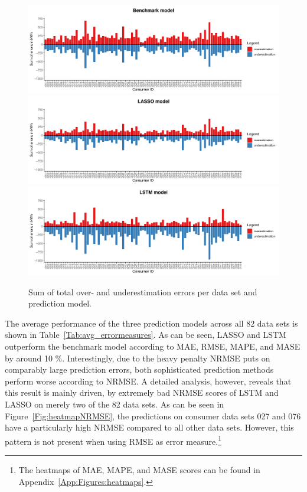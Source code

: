 \begin{figure}
    \centering
    \includegraphics[width=\textwidth]{thesis/graphs/evaluation/c_barplot_naive_overunderestimation.pdf}\\\vspace{.6cm}
    \includegraphics[width=\textwidth]{thesis/graphs/evaluation/c_barplot_LASSO_overunderestimation.pdf}\\\vspace{.6cm}
    \includegraphics[width=\textwidth]{thesis/graphs/evaluation/c_barplot_LSTM_overunderestimation.pdf}
    \caption[Sum of total over- and underestimation errors per data set]{Sum of total over- and underestimation errors per data set and prediction model. \quantnet\href{}{}}
    \label{Fig:overunderestimation}
\end{figure}
%
The average performance of the three prediction models across all 82 data sets is shown in Table~\ref{Tab:avg_errormeasures}. As can be seen, LASSO and LSTM outperform the benchmark model according to MAE, RMSE, MAPE, and MASE by around 10 \%. Interestingly, due to the heavy penalty NRMSE puts on comparably large prediction errors, both sophisticated prediction methods perform worse according to NRMSE. A detailed analysis, however, reveals that this result is mainly driven, by extremely bad NRMSE scores of LSTM and LASSO on merely two of the 82 data sets. As can be seen in Figure~\ref{Fig:heatmapNRMSE}, the predictions on consumer data sets 027 and 076 have a particularly high NRMSE compared to all other data sets. However, this pattern is not present when using RMSE as error measure.\footnote{The heatmaps of MAE, MAPE, and MASE scores can be found in Appendix~\ref{App:Figures:heatmaps}.}
